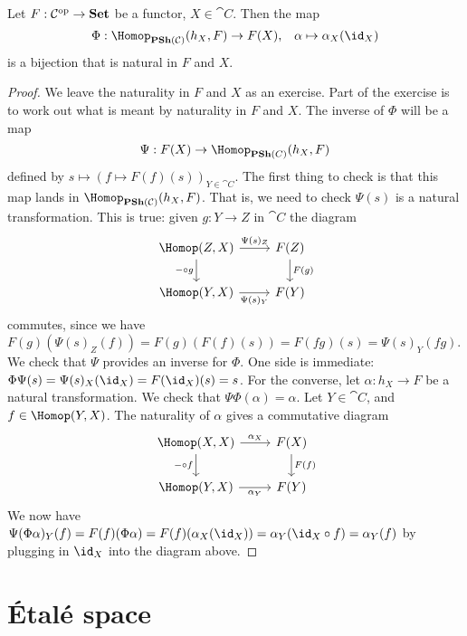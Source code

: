 \begin{lem}[name={\indexdefn{Yoneda lemma}~\cite[Theorem~2.2.4]{riehlCategoryTheoryContext2016}}]\label{lem:yoneda}
    Let $F: \mathcal{C}^{\mathrm{op}} \to \mathbf{Set}$ be a functor, $X \in \cat C$. Then the map \[
    \Phi: \Hom_{\catPresheaf(\cat C)}(h_X, F) \to F(X)\text{,} \quad \alpha\mapsto \alpha_X(\id_X)
    \] is a bijection that is natural in $F$ and $X$. 
\end{lem}
\begin{proof}
    We leave the naturality in $F$ and $X$ as an exercise. Part of the exercise is to work out what is meant by naturality in $F$ and $X$. 
    The inverse of $\Phi$ will be a map \[
    \Psi: F(X) \to \Hom_{\catPresheaf(C)}(h_X, F)
    \] defined by $s \mapsto (f \mapsto F(f)(s))_{Y \in \cat C}$.
    The first thing to check is that this map lands in $\Hom_{\catPresheaf(\cat C)}(h_X, F)$. That is, we need to check $\Psi(s)$ is a natural transformation. This is true: given $g: Y \to Z$ in $\cat C$ the diagram 
    \[
    \begin{tikzcd}
{\Hom(Z,X)} \arrow[d, "-\circ g"'] \arrow[r, "\Psi(s)_Z"] & F(Z) \arrow[d, "F(g)"] \\
{\Hom(Y,X)} \arrow[r, "\Psi(s)_Y"']                       & F(Y)            
\end{tikzcd}
    \] commutes, since we have $F(g)(\Psi(s)_Z(f)) = F(g)(F(f)(s)) = F(fg)(s) = \Psi(s)_Y(fg)$.
    We check that $\Psi$ provides an inverse for $\Phi$. One side is immediate: $\Phi \Psi(s) = \Psi(s)_X(\id_X) = F(\id_X)(s) = s$. 
    For the converse, let $\alpha: h_X \to F$ be a natural transformation. We check that $\Psi \Phi(\alpha) = \alpha$. 
    Let $Y \in \cat C$, and $f \in \Hom(Y, X)$. The naturality of $\alpha$ gives a commutative diagram
    \[
    \begin{tikzcd}
{\Hom(X,X)} \arrow[d, "-\circ f"'] \arrow[r, "\alpha_X"] & F(X) \arrow[d, "F(f)"] \\
{\Hom(Y,X)} \arrow[r, "\alpha_Y"']                        & F(Y)                  
\end{tikzcd}
\] We now have $\Psi(\Phi \alpha)_Y(f) = F(f)(\Phi \alpha) = F(f) (\alpha_X(\id_X)) = \alpha_Y (\id_X \circ f)= \alpha_Y(f)$ by plugging in $\id_X$ into the diagram above. 
\end{proof}

\section{Étalé space}

